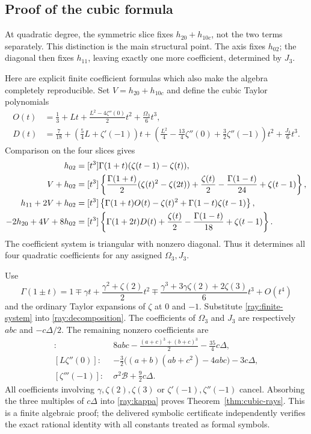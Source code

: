 \documentclass[11pt]{article}
\numberwithin{equation}{section}
\theoremstyle{definition}
\theoremstyle{remark}
\begin{document}
\subsection{Proof of the cubic formula}

At quadratic degree, the symmetric slice fixes
$h_{20}+h_{10c}$, not the two terms separately. This distinction is
the main structural point. The axis fixes $h_{02}$; the diagonal
then fixes $h_{11}$, leaving exactly one more coefficient, determined
by $J_3$.

Here are explicit finite coefficient formulas which also make the
algebra completely reproducible. Set $V=h_{20}+h_{10c}$ and define
the cubic Taylor polynomials
\begin{align*}
 O(t)&=\frac13+Lt+\frac{L^2-4\zeta''(0)}2t^2
                         +\frac{\Omega_3}{6}t^3,\\
 D(t)&=\frac7{18}+\left(\frac54L+\zeta'(-1)\right)t
       +\left(\frac{L^2}{4}-\frac{13}{4}\zeta''(0)
                               +\frac32\zeta''(-1)\right)t^2
       +\frac{J_3}{6}t^3.
\end{align*}
Comparison on the four slices gives
\begin{align}
 h_{02}&=[t^3]\Gamma(1+t)(\zeta(t-1)-\zeta(t)),\notag\\
 V+h_{02}&=[t^3]\left\{
 \frac{\Gamma(1+t)}2(\zeta(t)^2-\zeta(2t))
 +\frac{\zeta(t)}2-\frac{\Gamma(1-t)}{24}+\zeta(t-1)\right\},\notag\\
 h_{11}+2V+h_{02}&=[t^3]\left\{
 \Gamma(1+t)O(t)-\zeta(t)^2+\Gamma(1-t)\zeta(t-1)\right\},\notag\\
 -2h_{20}+4V+8h_{02}&=[t^3]\left\{
 \Gamma(1+2t)D(t)+\frac{\zeta(t)}2
                      -\frac{\Gamma(1-t)}{18}+\zeta(t-1)\right\}.
 \label{ray:finite-system}
\end{align}
The coefficient system is triangular with nonzero diagonal. Thus
it determines all four quadratic coefficients for any assigned
$\Omega_3,J_3$.

Use
\[
 \Gamma(1\pm t)=1\mp\gamma t+
 \frac{\gamma^2+\zeta(2)}2t^2
 \mp\frac{\gamma^3+3\gamma\zeta(2)+2\zeta(3)}6t^3+O(t^4)
\]
and the ordinary Taylor expansions of $\zeta$ at $0$ and $-1$.
Substitute \eqref{ray:finite-system} into
\eqref{ray:decomposition}. The coefficients of $\Omega_3$ and
$J_3$ are respectively $abc$ and $-c\Delta/2$.
The remaining nonzero coefficients are
\begin{align*}
 [\zeta'''(0)]\colon\;&8abc-\frac{(a+c)^3+(b+c)^3}{2}
                                      -\frac{35}{4}c\Delta,\\
 [L\zeta''(0)]\colon\;&-\frac32\bigl((a+b)(ab+c^2)-4abc\bigr)
                                      -3c\Delta,\\
 [\zeta'''(-1)]\colon\;&\sigma^2\mathcal B+\frac92c\Delta.
\end{align*}
All coefficients involving $\gamma,\zeta(2),\zeta(3)$ or
$\zeta'(-1),\zeta''(-1)$ cancel. Absorbing the three multiples
of $c\Delta$ into \eqref{ray:kappa} proves
Theorem~\ref{thm:cubic-rays}. This is a finite algebraic proof;
the delivered symbolic certificate independently verifies the exact
rational identity with all constants treated as formal symbols.
\end{document}
